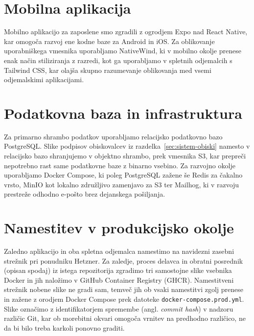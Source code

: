 \section{Mobilna aplikacija}

Mobilno aplikacijo za zaposlene smo zgradili z ogrodjem Expo nad React Native, kar omogoča razvoj ene kodne baze za Android in iOS. Za oblikovanje uporabniškega vmesnika uporabljamo NativeWind, ki v mobilno okolje prenese enak način stiliziranja z razredi, kot ga uporabljamo v spletnih odjemalcih s Tailwind CSS, kar olajša skupno razumevanje oblikovanja med vsemi odjemalskimi aplikacijami.

\section{Podatkovna baza in infrastruktura}

Za primarno shrambo podatkov uporabljamo relacijsko podatkovno bazo PostgreSQL. Slike podpisov obiskovalcev iz razdelka~\ref{sec:sistem-obiski} namesto v relacijsko bazo shranjujemo v objektno shrambo, prek vmesnika S3, kar prepreči nepotrebno rast same podatkovne baze z binarno vsebino. Za razvojno okolje uporabljamo Docker Compose, ki poleg PostgreSQL zažene še Redis za čakalno vrsto, MinIO kot lokalno združljivo zamenjavo za S3 ter Mailhog, ki v razvoju prestreže odhodno e-pošto brez dejanskega pošiljanja.

\section{Namestitev v produkcijsko okolje}
\label{sec:namestitev}

Zaledno aplikacijo in oba spletna odjemalca namestimo na navidezni zasebni strežnik pri ponudniku Hetzner. Za zaledje, proces delavca in obratni posrednik (opisan spodaj) iz istega repozitorija zgradimo tri samostojne slike vsebnika Docker in jih naložimo v GitHub Container Registry (GHCR). Namestitveni strežnik nobene slike ne gradi sam, temveč jih ob vsaki namestitvi zgolj prenese in zažene z orodjem Docker Compose prek datoteke \texttt{docker-compose.prod.yml}. Slike označimo z identifikatorjem spremembe (angl. \textit{commit hash}) v nadzoru različic Git, kar ob morebitni okvari omogoča vrnitev na predhodno različico, ne da bi bilo treba karkoli ponovno graditi.

